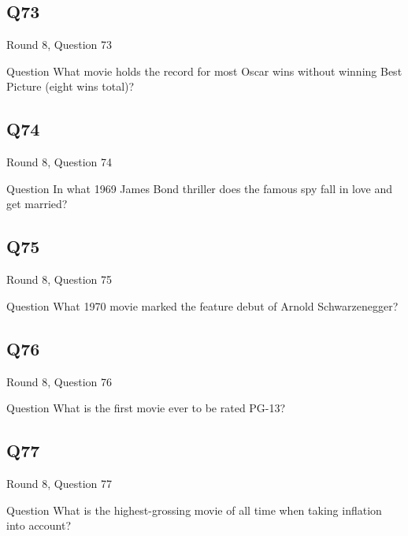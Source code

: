 \documentclass[11pt]{beamer}
\begin{document}
\subsection*{Q73}
\begin{frame}[t]{Round 8, Question 73}
  \vspace{2em}
  \begin{block}{Question}
    What movie holds the record for most Oscar wins without winning Best Picture (eight wins total)?
  \end{block}
\end{frame}


\subsection*{Q74}
\begin{frame}[t]{Round 8, Question 74}
  \vspace{2em}
  \begin{block}{Question}
    In what 1969 James Bond thriller does the famous spy fall in love and get married?
  \end{block}
\end{frame}


\subsection*{Q75}
\begin{frame}[t]{Round 8, Question 75}
  \vspace{2em}
  \begin{block}{Question}
    What 1970 movie marked the feature debut of Arnold Schwarzenegger?
  \end{block}
\end{frame}


\subsection*{Q76}
\begin{frame}[t]{Round 8, Question 76}
  \vspace{2em}
  \begin{block}{Question}
    What is the first movie ever to be rated PG-13?
  \end{block}
\end{frame}


\subsection*{Q77}
\begin{frame}[t]{Round 8, Question 77}
  \vspace{2em}
  \begin{block}{Question}
    What is the highest-grossing movie of all time when taking inflation into account?
  \end{block}
\end{frame}
\end{document}
